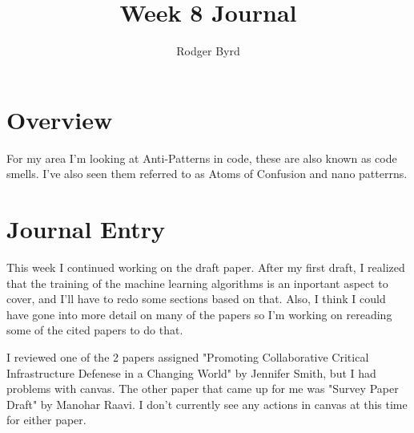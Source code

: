 \documentclass[conference]{IEEEtran}
\begin{document}

\title{Week 8 Journal}
\author{Rodger Byrd}
\maketitle


\section{Overview}
For my area I'm looking at Anti-Patterns in code, these are also known as code smells. I've also seen them referred to as Atoms of Confusion and nano patterrns.

\section{Journal Entry}
This week I continued working on the draft paper. After my first draft, I realized that the training of the machine learning algorithms is an inportant aspect to cover, and I'll have to redo some sections based on that. Also, I think I could have gone into more detail on many of the papers so I'm working on rereading some of the cited papers to do that. 

I reviewed one of the 2 papers assigned "Promoting Collaborative Critical Infrastructure Defenese in a Changing World" by Jennifer Smith, but I had problems with canvas. The other paper that came up for me was "Survey Paper Draft" by Manohar Raavi. I don't currently see any actions in canvas at this time for either paper. 


\nocite{*}
\clearpage


%
%
\end{document}

